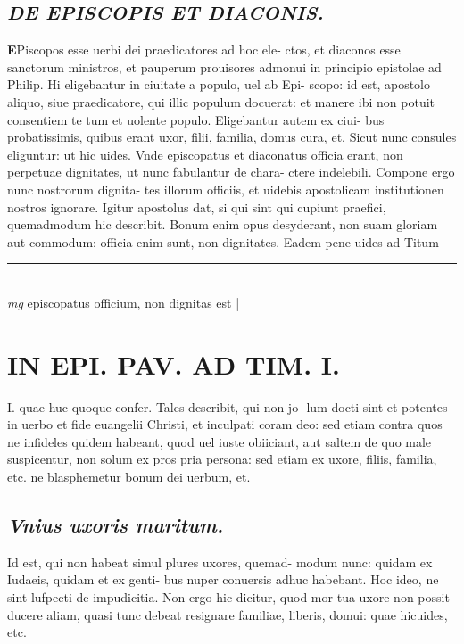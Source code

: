 \documentclass{article}
\begin{document}
\begin{pages}
\subsection*{\textit{DE EPISCOPIS ET DIACONIS. }}\pstart \huge\textbf{E}\normalsize Piscopos esse uerbi dei praedicatores ad hoc ele- ctos, et diaconos esse sanctorum ministros, et pauperum prouisores admonui in principio epistolae ad Philip. Hi eligebantur in ciuitate a populo, uel ab Epi- scopo: id est, apostolo aliquo, siue praedicatore, qui illic populum docuerat: et manere ibi non potuit consentiem te tum et uolente populo. Eligebantur autem ex ciui- bus probatissimis, quibus erant uxor, filii, familia, domus cura, et. Sicut nunc consules eliguntur: ut hic uides. Vnde episcopatus et diaconatus officia erant, non perpetuae dignitates, ut nunc fabulantur de chara- ctere indelebili. Compone ergo nunc nostrorum dignita- tes illorum officiis, et uidebis apostolicam institutionen nostros ignorare. Igitur apostolus dat, si qui sint qui cupiunt praefici, quemadmodum hic describit. Bonum enim opus desyderant, non suam gloriam aut commodum: officia enim sunt, non dignitates. Eadem pene uides ad Titum  \pend
\vspace{0.5cm}\noindent
\vspace{0.2cm}\rule{1cm}{0.2pt}\\ 
\hspace{0.2cm}\textit{mg}
\footnotesize episcopatus officium, non dignitas est 
\normalsize| 
\section*{IN EPI. PAV. AD TIM. I. }\pstart I. quae huc quoque confer. Tales describit, qui non jo- lum docti sint et potentes in uerbo et fide euangelii Christi, et inculpati coram deo: sed etiam contra quos ne infideles quidem habeant, quod uel iuste obiiciant, aut saltem de quo male suspicentur, non solum ex pros pria persona: sed etiam ex uxore, filiis, familia, etc. ne blasphemetur bonum dei uerbum, et.  \pend
{}
{}
\subsection*{\textit{Vnius uxoris maritum. }}\pstart Id est, qui non habeat simul plures uxores, quemad- modum nunc: quidam ex Iudaeis, quidam et ex genti- bus nuper conuersis adhuc habebant. Hoc ideo, ne sint lufpecti de impudicitia. Non ergo hic dicitur, quod mor tua uxore non possit ducere aliam, quasi tunc debeat resignare familiae, liberis, domui: quae hicuides, etc.  \pend
{}
{}

\end{pages}
\end{document}
